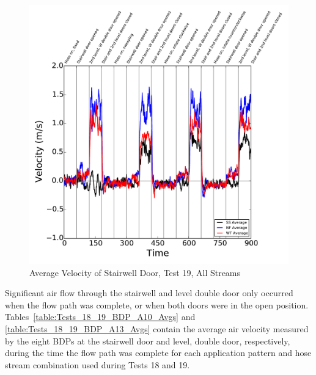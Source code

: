 \documentclass[12pt,oneside]{book}
\begin{document}
\begin{figure}[!ht]
\includegraphics[width=6in]{../../Figures/Hose_Test_Figures/Test_19_West_063014_BDP_A10_Avg}
\caption{Average Velocity of Stairwell Door, Test 19, All Streams}
\label{fig:Test_19_BDP_A10_Avg_All}
\end{figure}

\clearpage

Significant air flow through the stairwell and  level double door only occurred when the flow path was complete, or when both doors were in the open position. Tables~\ref{table:Tests_18_19_BDP_A10_Avgs} and \ref{table:Tests_18_19_BDP_A13_Avgs} contain the average air velocity measured by the eight BDPs at the stairwell door and  level, double door, respectively, during the time the flow path was complete for each application pattern and hose stream combination used during Tests 18 and 19.
\end{document}
